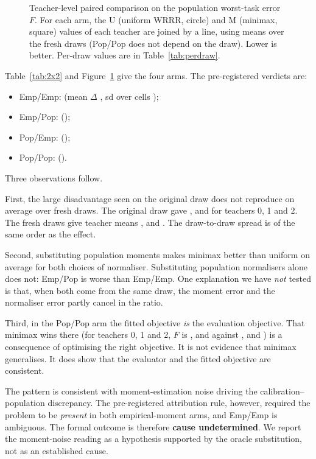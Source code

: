 \begin{figure}[t]
\centering

\caption{Teacher-level paired comparison on the population worst-task error $F$. For each arm,
the U (uniform WRRR, circle) and M (minimax, square) values of each teacher are joined by a line,
using means over the \CfgNResamples{} fresh draws (Pop/Pop does not depend on the draw).
Lower is better. Per-draw values are in
Table~\ref{tab:perdraw}.}
\label{fig:paired}
\end{figure}

Table~\ref{tab:2x2} and Figure~\ref{fig:paired} give the four arms. The pre-registered verdicts
are:
\begin{itemize}
\item Emp/Emp: \STwoVerdictEE{} (mean $\Delta$ \STwoDeltaEE, sd over cells \STwoDeltaSDEE);
\item Emp/Pop: \STwoVerdictEP{} (\STwoDeltaEP);
\item Pop/Emp: \STwoVerdictPE{} (\STwoDeltaPE);
\item Pop/Pop: \STwoVerdictPP{} (\STwoDeltaPP).
\end{itemize}
Three observations follow.

First, the large disadvantage seen on the original draw does not reproduce on average over fresh
draws. The original draw gave \STwoOrigDeltaEETA, \STwoOrigDeltaEETB{} and \STwoOrigDeltaEETC{}
for teachers 0, 1 and 2. The fresh draws give teacher means \STwoDeltaEETA, \STwoDeltaEETB{} and
\STwoDeltaEETC. The draw-to-draw spread is of the same order as the effect.

Second, substituting population moments makes minimax better than uniform on average for both
choices of normaliser. Substituting population normalisers alone does not: Emp/Pop is worse than
Emp/Emp. One explanation we have \emph{not} tested is that, when both come from the same draw, the
moment error and the normaliser error partly cancel in the ratio.

Third, in the Pop/Pop arm the fitted objective \emph{is} the evaluation objective. That minimax
wins there (for teachers 0, 1 and 2, $F$ is \STwoPPMinimaxTA, \STwoPPMinimaxTB{} and
\STwoPPMinimaxTC{} against \STwoPPUniformTA, \STwoPPUniformTB{} and \STwoPPUniformTC) is a
consequence of optimising the right objective. It is not evidence that minimax generalises. It
does show that the evaluator and the fitted objective are consistent.

The pattern is consistent with moment-estimation noise driving the calibration--population
discrepancy. The pre-registered attribution rule, however, required the problem to be
\emph{present} in both empirical-moment arms, and Emp/Emp is ambiguous. The formal outcome is
therefore \textbf{cause undetermined}. We report the moment-noise reading as a hypothesis
supported by the oracle substitution, not as an established cause.

